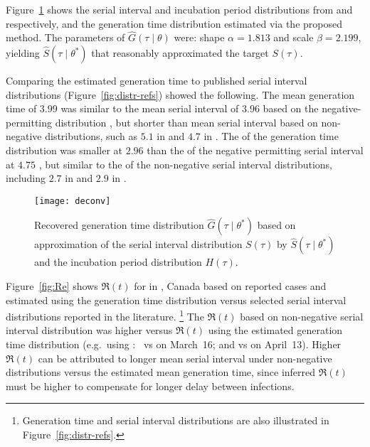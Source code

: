 Figure~\ref{fig:deconv} shows the
serial interval and incubation period distributions
from \citep{Du2020} and \citep{Lauer2020} respectively,
and the generation time distribution estimated via the proposed method.
The \mle parameters of $\hat{G}(\tau\mid\theta)$ were:
shape ${\alpha = 1.813}$ and scale ${\beta = 2.199}$,
yielding $\hat{S}(\tau\mid\theta^*)$
that reasonably approximated the target $S(\tau)$.
\par
Comparing the estimated generation time to published serial interval distributions
(Figure~\ref{fig:distr-refs}) showed the following.
The mean generation time of $3.99$ was similar to
the mean serial interval of $3.96$
based on the negative-permitting distribution \citep{Du2020},
but shorter than mean serial interval based on non-negative distributions,
such as $5.1$ in \citep{Zhang2020} and $4.7$ in \citep{Nishiura2020}.
The \sd of the generation time distribution was smaller at $2.96$
than the \sd of the negative permitting serial interval at $4.75$ \citep{Du2020},
but similar to the \sd of the non-negative serial interval distributions,
including $2.7$ in \citep{Zhang2020} and $2.9$ in \citep{Nishiura2020}.
\par
\begin{figure}
  \centering
  \texttt{[image: deconv]}
  \caption{Recovered generation time distribution
    $\hat{G}(\tau\mid\theta^*)$
    based on \mle approximation of the serial interval distribution
    $S(\tau)$ by $\hat{S}(\tau\mid\theta^*)$
    and the incubation period distribution $H(\tau)$.}
  \label{fig:deconv}
\end{figure}
\par
Figure~\ref{fig:Re} shows
$\Re(t)$ for \covid in \gta, Canada
based on reported cases and estimated using
the generation time distribution versus
selected serial interval distributions reported in the literature.%
\footnote{Generation time and serial interval distributions
  are also illustrated in Figure~\ref{fig:distr-refs}.}
The $\Re(t)$ based on non-negative serial interval distribution was higher
versus $\Re(t)$ using the estimated generation time distribution
(e.g.\ using \citep{Zhang2020}:\
 vs
 on March~16; and
 vs
 on April~13).
Higher $\Re(t)$ can be attributed to
longer mean serial interval under non-negative distributions
versus the estimated mean generation time,
since inferred $\Re(t)$ must be higher
to compensate for longer delay between infections.%
